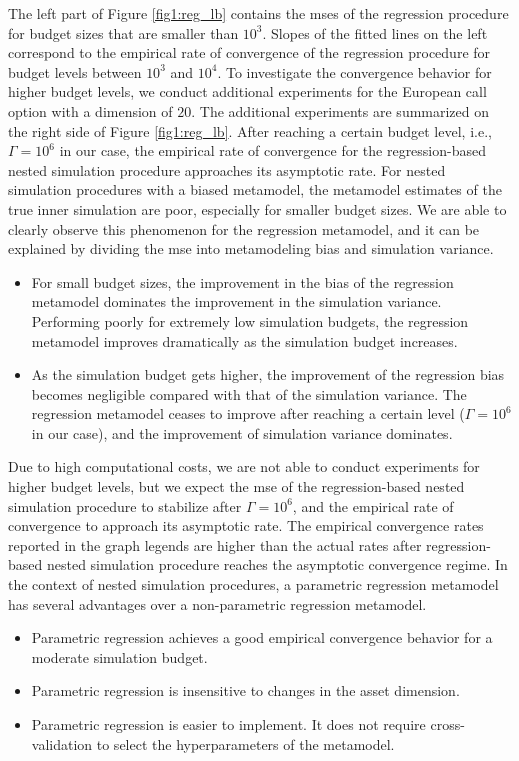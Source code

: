 The left part of Figure \ref{fig1:reg_lb} contains the \gls{mse}s of the regression procedure for budget sizes that are smaller than $10^3$. 
Slopes of the fitted lines on the left correspond to the empirical rate of convergence of the regression procedure for budget levels between $10^3$ and $10^4$.
To investigate the convergence behavior for higher budget levels, we conduct additional experiments for the European call option with a dimension of $20$. 
The additional experiments are summarized on the right side of Figure \ref{fig1:reg_lb}.
After reaching a certain budget level, i.e., $\Gamma = 10^6$ in our case, the empirical rate of convergence for the regression-based nested simulation procedure approaches its asymptotic rate. 
For nested simulation procedures with a biased metamodel, the metamodel estimates of the true inner simulation are poor, especially for smaller budget sizes. 
We are able to clearly observe this phenomenon for the regression metamodel, and it can be explained by dividing the \gls{mse} into metamodeling bias and simulation variance.
\begin{itemize}
    \item For small budget sizes, the improvement in the bias of the regression metamodel dominates the improvement in the simulation variance. 
    Performing poorly for extremely low simulation budgets, the regression metamodel improves dramatically as the simulation budget increases.
    \item As the simulation budget gets higher, the improvement of the regression bias becomes negligible compared with that of the simulation variance. 
    The regression metamodel ceases to improve after reaching a certain level ($\Gamma = 10^6$ in our case), and the improvement of simulation variance dominates.
\end{itemize}
Due to high computational costs, we are not able to conduct experiments for higher budget levels, but we expect the \gls{mse} of the regression-based nested simulation procedure to stabilize after $\Gamma = 10^6$, and the empirical rate of convergence to approach its asymptotic rate.
The empirical convergence rates reported in the graph legends are higher than the actual rates after regression-based nested simulation procedure reaches the asymptotic convergence regime.
In the context of nested simulation procedures, a parametric regression metamodel has several advantages over a non-parametric regression metamodel.
\begin{itemize}
    \item Parametric regression achieves a good empirical convergence behavior for a moderate simulation budget.
    \item Parametric regression is insensitive to changes in the asset dimension.
    \item Parametric regression is easier to implement.
    It does not require cross-validation to select the hyperparameters of the metamodel.
\end{itemize}
